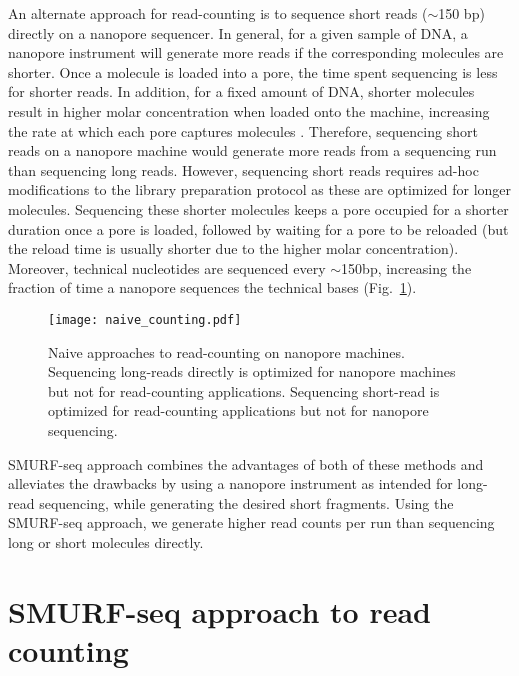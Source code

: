 An alternate approach for read-counting is to sequence short reads
($\sim$150 bp) directly on a nanopore sequencer.
In general, for a given sample of DNA, a nanopore instrument will
generate more reads if the corresponding molecules are shorter.  Once a
molecule is loaded into a pore, the time spent sequencing is less for
shorter reads. In addition, for a fixed amount of DNA, shorter molecules
result in higher molar concentration when loaded onto the machine,
increasing the rate at which each pore captures molecules
\citep{muthukumar2010theory,wanunu2008dna}. Therefore, sequencing short
reads on a nanopore machine would generate more reads from a sequencing
run than sequencing long reads.
However, sequencing short reads requires ad-hoc modifications to the
library preparation protocol as these are optimized for longer
molecules.  Sequencing these shorter molecules keeps a pore occupied for
a shorter duration once a pore is loaded, followed by waiting for a pore
to be reloaded (but the reload time is usually shorter due to the higher
molar concentration). Moreover, technical nucleotides are sequenced
every $\sim$150bp, increasing the fraction of time a nanopore sequences
the technical bases (Fig.~\ref{naive_counting}).

\begin{figure}[b!]
\centering
\texttt{[image: naive\_counting.pdf]}
\caption[Naive approaches to read-counting on nanopore machines]{
  Naive approaches to read-counting on nanopore machines.
  Sequencing long-reads directly is optimized for nanopore machines but
  not for read-counting applications.
  Sequencing short-read is optimized for read-counting applications but
  not for nanopore sequencing.}
\label{naive_counting}
\end{figure}

SMURF-seq approach combines the advantages of both of these methods
and alleviates the drawbacks by using a nanopore instrument as
intended for long-read sequencing, while generating the desired short
fragments. Using the SMURF-seq approach, we generate higher read counts
per run than sequencing long or short molecules directly.


\section{SMURF-seq approach to read counting}

